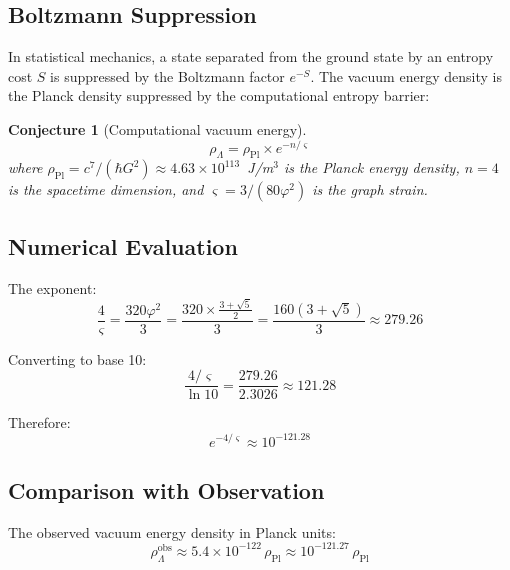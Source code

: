 \documentclass[11pt,a4paper]{article}
\newtheorem{conjecture}[theorem]{Conjecture}
\theoremstyle{definition}
\newcommand{\strain}{\varsigma}            %
\newcommand{\rhoL}{\rho_{\Lambda}}
\newcommand{\rhoPl}{\rho_{\text{Pl}}}
\begin{document}
\subsection{Boltzmann Suppression}

In statistical mechanics, a state separated from the ground state by an entropy cost $S$ is suppressed by the Boltzmann factor $e^{-S}$. The vacuum energy density is the Planck density suppressed by the computational entropy barrier:

\begin{conjecture}[Computational vacuum energy]\label{conj:cc}
\begin{equation}\label{eq:rhoL}
    \boxed{\rhoL = \rhoPl \times e^{-n/\strain}}
\end{equation}
where $\rhoPl = c^7/(\hbar G^2) \approx 4.63 \times 10^{113}$~J/m$^3$ is the Planck energy density, $n = 4$ is the spacetime dimension, and $\strain = 3/(80\varphi^2)$ is the graph strain.
\end{conjecture}

\subsection{Numerical Evaluation}

The exponent:
\begin{equation}
    \frac{4}{\strain} = \frac{320\varphi^2}{3} = \frac{320 \times \tfrac{3+\sqrt{5}}{2}}{3} = \frac{160(3+\sqrt{5})}{3} \approx 279.26
\end{equation}

Converting to base 10:
\begin{equation}
    \frac{4/\strain}{\ln 10} = \frac{279.26}{2.3026} \approx 121.28
\end{equation}

Therefore:
\begin{equation}
    e^{-4/\strain} \approx 10^{-121.28}
\end{equation}

\subsection{Comparison with Observation}

The observed vacuum energy density in Planck units:
\begin{equation}
    \rhoL^{\text{obs}} \approx 5.4 \times 10^{-122}\,\rhoPl \approx 10^{-121.27}\,\rhoPl
\end{equation}
\end{document}
